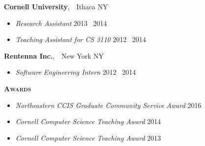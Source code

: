 \documentclass{article}
\newcommand{\mysection}[1]{\vspace{0.5cm}
\hspace{-1.3cm}\textsc{\textbf{#1}}~\hrulefill}
\newcommand{\mysubsection}[1]{\hspace{-0.7cm}\textbf{#1}}
\begin{document}
\mysubsection{Cornell University},~~Ithaca NY
\begin{itemize}
\item \emph{Research Assistant} \hfill 2013 \textendash\ 2014
\item \emph{Teaching Assistant for CS 3110} \hfill 2012 \textendash\ 2014
\end{itemize}

\mysubsection{Rentenna Inc.},~~New York NY
\begin{itemize}
\item \emph{Software Engineering Intern} \hfill 2012 \textendash\ 2014
\end{itemize}

\newpage
\mysection{Awards} %
\begin{itemize}
\item \emph{Northeastern CCIS Graduate Community Service Award} \hfill 2016
\item \emph{Cornell Computer Science Teaching Award} \hfill 2014
\item \emph{Cornell Computer Science Teaching Award} \hfill 2013
\end{itemize}

\end{document}
